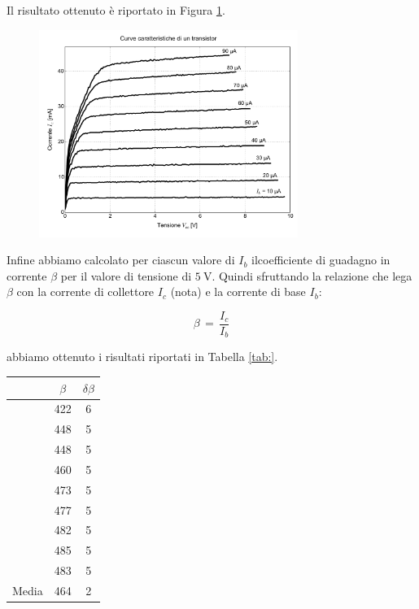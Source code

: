 Il risultato ottenuto è riportato in Figura \ref{fig:cara}.

\begin{figure}
	\centering
	\includegraphics[width=0.75\textwidth]{transistor.pdf}
	\caption{}
	\label{fig:cara}
\end{figure}

Infine abbiamo calcolato per ciascun valore di $I_b$ ilcoefficiente di guadagno in corrente $\beta$ per il valore di tensione di $\SI{5}{\volt}$. Quindi sfruttando la relazione che lega $\beta$ con la corrente di collettore $I_c$ (nota) e la corrente di base $I_b$:

\begin{equation}
	\beta \,=\, \frac{I_c}{I_b}
\end{equation}

abbiamo ottenuto i risultati riportati in Tabella \ref{tab:}.

\begin{table}
    \centering
    \begin{tabular}{l c c}
        \toprule
        &$\beta$ & $\delta\beta$ \\
        \midrule
        & 422 & 6 \\
        & 448 & 5 \\
        & 448 & 5 \\
        & 460 & 5 \\
        & 473 & 5 \\
        & 477 & 5 \\
        & 482 & 5 \\
        & 485 & 5 \\
        & 483 & 5 \\
        \midrule
        Media & 464 & 2 \\
        \bottomrule
    \end{tabular}
\end{table}

